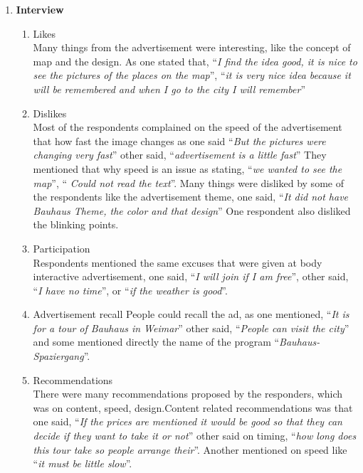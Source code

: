 \begin{enumerate}
\item \textbf{Interview} 
\begin{enumerate}
\item Likes \\
Many things from the advertisement were interesting, like the concept of map and the design. As one stated that, ``\emph{I find the idea good, it is nice to see the pictures of the places on the map}'', ``\emph{it is very nice idea because it will be remembered and when I go to the city I will remember}''

\item Dislikes \\
Most of the respondents complained on the speed of the advertisement that how fast the image changes as one said ``\emph{But the pictures were changing very fast}'' other said, ``\emph{advertisement is a little fast}'' They mentioned that why speed is an issue as stating, ``\emph{we wanted to see the map}'', ``\emph{ Could not read the text}''. Many things were disliked by some of the respondents like the advertisement theme, one said, ``\emph{It did not have Bauhaus Theme, the color and that design}'' One respondent also disliked the blinking points.

\item  Participation \\
Respondents mentioned the same excuses that were given at body interactive advertisement, one said, ``\emph{I will join if I am free}'', other said, ``\emph{I have no time}'', or ``\emph{if the weather is good}''. 

\item  Advertisement recall
People could recall the ad, as one mentioned, ``\emph{It is for a tour of Bauhaus in Weimar}'' other said, ``\emph{People can visit the city}'' and some mentioned directly the name of the program ``\emph{Bauhaus-Spaziergang}''.

\item Recommendations \\
There were many recommendations proposed by the responders, which was on content, speed, design.Content related recommendations was that one said, ``\emph{If the prices are mentioned it would be good so that they can decide if they want to take it or not}'' other said on timing, ``\emph{how long does this tour take so people arrange their}''. Another mentioned on speed like ``\emph{it must be little slow}''.

\end{enumerate}



\end{enumerate}
